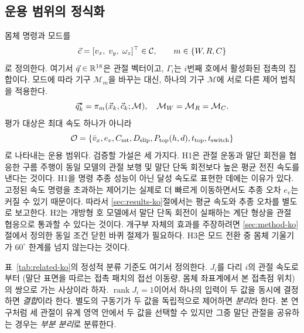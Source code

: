 \subsection{운용 범위의 정식화}

몸체 명령과 모드를
\begin{equation}
 \vec{c}=[v_x,\;v_y,\;\omega_z]^\top\in\mathcal{C},\qquad
 m\in\{W,R,C\}                                                 \label{eq:command-ko}
\end{equation}
로 정의한다. 여기서 $\vec{q}\in\mathbb{R}^{18}$은 관절 벡터이고, $\Gamma_i$는 $i$번째
호에서 활성화된 접촉의 집합이다. 모드에 따라 기구 $\mathcal{M}_m$을 바꾸는 대신,
하나의 기구 $\mathcal{M}$에 서로 다른 제어 법칙을 적용한다.
\begin{equation}
 \vec{q}^{\star}_{k}=\pi_m(\vec{x}_k,\vec{c}_k;\mathcal{M}),
 \quad \mathcal{M}_W=\mathcal{M}_R=\mathcal{M}_C.              \label{eq:reuse-ko}
\end{equation}
평가 대상은 최대 속도 하나가 아니라
\begin{equation}
 \mathcal{O}=\{\bar v_x, e_v, C_{\rm mt},D_{\rm slip},
 P_{\rm top}(h,d),t_{\rm top},t_{\rm switch}\}                \label{eq:envelope-ko}
\end{equation}
로 나타내는 운용 범위다. 검증할 가설은 세 가지다. H1은 관절 운동과 말단 회전을
협응한 구름 주행이 동일 모델의 관절 보행 및 말단 단독 회전보다 높은 평균 전진
속도를 낸다는 것이다. H1을 명령 추종 성능이 아닌 달성 속도로 표현한 데에는
이유가 있다. 고정된 속도 명령을 초과하는 제어기는 실제로 더 빠르게 이동하면서도
추종 오차 $e_v$는 커질 수 있기 때문이다. 따라서 \ref{sec:results-ko}절에서는
평균 속도와 추종 오차를 별도로 보고한다. H2는 개방형 호 모델에서 말단 단독
회전이 실패하는 계단 형상을 관절 협응으로 통과할 수 있다는 것이다. 개구부 자체의
효과를 주장하려면 \ref{sec:method-ko}절에서 정의한 동일 조건 닫힌 바퀴 절제가
필요하다. H3은 모드 전환 중 몸체 기울기가 $60^\circ$ 한계를 넘지 않는다는 것이다.

표~\ref{tab:related-ko}의 정성적 분류 기준도 여기서 정의한다. $J_i$를 다리 $i$의
관절 속도로부터 (말단 표면을 따르는 접촉 패치의 접선 이동량, 몸체 좌표계에서 본
접촉점 위치)의 쌍으로 가는 사상이라 하자. $\operatorname{rank}J_i=1$이어서 하나의
입력이 두 값을 동시에 결정하면 \emph{결합}이라 한다. 별도의 구동기가 두 값을
독립적으로 제어하면 \emph{분리}라 한다. 본 연구처럼 세 관절이 유계 영역 안에서
두 값을 선택할 수 있지만 그중 말단 관절을 공유하는 경우는 \emph{부분 분리}로
분류한다.

